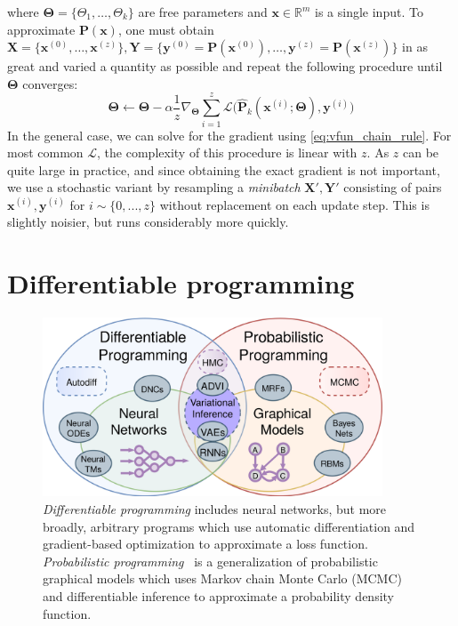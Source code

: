 \documentclass[12pt,initial,twoside,maitrise]{dms}
\numberwithin{equation}{section}
\numberwithin{table}{chapter}
\numberwithin{figure}{chapter}
\begin{document}
%
where $\mathbf\Theta = \{\Theta_1, \dots, \Theta_k\}$ are free parameters and $\mathbf{x} \in \mathbb{R}^m$ is a single input. To approximate $\mathbf{P}(\mathbf x)$, one must obtain $\mathbf{X} = \{\mathbf{x}^{(0)}, \dots, \mathbf{x}^{(z)}\}, \mathbf{Y} = \{\mathbf{y}^{(0)} = \mathbf{P}(\mathbf{x}^{(0)}), \dots, \mathbf{y}^{(z)} = \mathbf{P}(\mathbf{x}^{(z)})\}$ in as great and varied a quantity as possible and repeat the following procedure until $\mathbf\Theta$ converges:
%
\begin{equation} \label{eq:stochastic_grad_descent}
    \mathbf\Theta \leftarrow \mathbf\Theta - \alpha\frac{1}{z}\nabla_{\mathbf\Theta} \sum_{i=1}^z\mathcal{L}\big(\mathbf{\hat P}_k(\mathbf{x}^{(i)}; \mathbf{\Theta}), \mathbf{y}^{(i)}\big)
\end{equation}
%
In the general case, we can solve for the gradient using \autoref{eq:vfun_chain_rule}. For most common $\mathcal{L}$, the complexity of this procedure is linear with $z$. As $z$ can be quite large in practice, and since obtaining the exact gradient is not important, we use a stochastic variant by resampling a \textit{minibatch} $\mathbf{X}', \mathbf{Y}'$ consisting of pairs $\mathbf{x}^{(i)}, \mathbf{y}^{(i)}$ for $i \sim \{0, ..., z\}$ without replacement on each update step. This is slightly noisier, but runs considerably more quickly.

\section{Differentiable programming}\label{sec:differentiable-programming}

\begin{figure}
    \centering
    \includegraphics[width=0.90\textwidth]{../figures/diff_prob_prog.png}
    \caption{\textit{Differentiable programming} includes neural networks, but more broadly, arbitrary programs which use automatic differentiation and gradient-based optimization to approximate a loss function. \textit{Probabilistic programming}~\citep{carpenter2017stan, gorinova2018slicstan} is a generalization of probabilistic graphical models which uses Markov chain Monte Carlo (MCMC) and differentiable inference to approximate a probability density function.}
    \label{fig:diff_prob_prog}
\end{figure}
\end{document}
